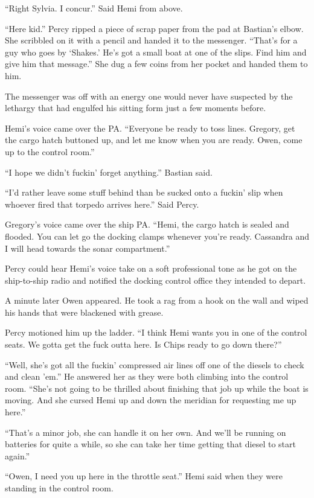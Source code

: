 \documentclass[]{scrbook}
\begin{document}
``Right Sylvia. I concur.'' Said Hemi from above.

``Here kid.'' Percy ripped a piece of scrap paper from the pad at
Bastian's elbow. She scribbled on it with a pencil and handed it to the
messenger. ``That's for a guy who goes by `Shakes.' He's got a small
boat at one of the slips. Find him and give him that message.'' She dug
a few coins from her pocket and handed them to him.

The messenger was off with an energy one would never have suspected by
the lethargy that had engulfed his sitting form just a few moments
before.

Hemi's voice came over the PA. ``Everyone be ready to toss lines.
Gregory, get the cargo hatch buttoned up, and let me know when you are
ready. Owen, come up to the control room.''

``I hope we didn't fuckin' forget anything.'' Bastian said.

``I'd rather leave some stuff behind than be sucked onto a fuckin' slip
when whoever fired that torpedo arrives here.'' Said Percy.

Gregory's voice came over the ship PA. ``Hemi, the cargo hatch is sealed
and flooded. You can let go the docking clamps whenever you're ready.
Cassandra and I will head towards the sonar compartment.''

Percy could hear Hemi's voice take on a soft professional tone as he got
on the ship-to-ship radio and notified the docking control office they
intended to depart.

A minute later Owen appeared. He took a rag from a hook on the wall and
wiped his hands that were blackened with grease.

Percy motioned him up the ladder. ``I think Hemi wants you in one of the
control seats. We gotta get the fuck outta here. Is Chips ready to go
down there?''

``Well, she's got all the fuckin' compressed air lines off one of the
diesels to check and clean 'em.'' He answered her as they were both
climbing into the control room. ``She's not going to be thrilled about
finishing that job up while the boat is moving. And she cursed Hemi up
and down the meridian for requesting me up here.''

``That's a minor job, she can handle it on her own. And we'll be running
on batteries for quite a while, so she can take her time getting that
diesel to start again.''

``Owen, I need you up here in the throttle seat.'' Hemi said when they
were standing in the control room.
\end{document}
